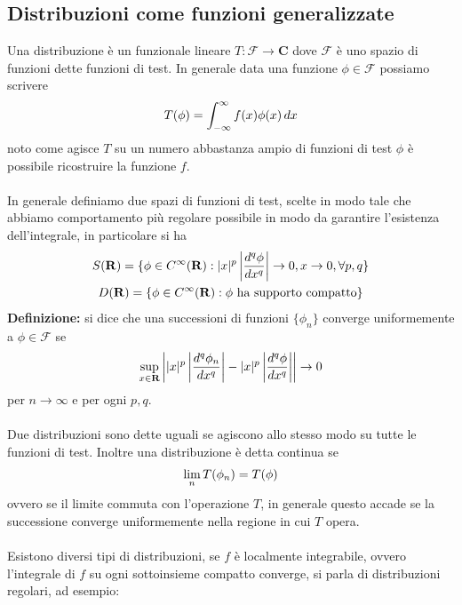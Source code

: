\documentclass{article}
\begin{document}
\subsection{Distribuzioni come funzioni generalizzate}
Una distribuzione è un funzionale lineare $T : \mathcal{F} \longrightarrow \mathbf{C}$ dove $\mathcal{F}$ è uno spazio di funzioni dette funzioni di test. In generale data una funzione $\phi \in \mathcal{F}$ possiamo scrivere
\begin{gather}
    T(\phi) = \int_{-\infty}^{\infty}f(x)\phi(x) \, dx \notag
\end{gather}
noto come agisce $T$ su un numero abbastanza ampio di funzioni di test $\phi$ è possibile ricostruire la funzione $f$. \\ \\
In generale definiamo due spazi di funzioni di test, scelte in modo tale che abbiamo comportamento più regolare possibile in modo da garantire l'esistenza dell'integrale, in particolare si ha
\begin{gather}
    S(\mathbf{R}) = \{\phi \in C^\infty(\mathbf{R}) : |x|^p\left|\frac{d^q\phi}{dx^q}\right| \rightarrow 0, x \rightarrow 0, \forall p, q\} \notag \\
    D(\mathbf{R}) = \{\phi \in C^\infty(\mathbf{R}) : \phi \text{ ha supporto compatto}\} \notag
\end{gather}
\textbf{Definizione:} si dice che una successioni di funzioni $\{\phi_n\}$ converge uniformemente a $\phi \in \mathcal{F}$ se
\begin{gather}
    \sup_{x \in \mathbf{R}}\left||x|^p\left|\frac{d^q\phi_n}{dx^q}\right| - |x|^p\left|\frac{d^q\phi}{dx^q}\right|\right| \rightarrow 0 \notag
\end{gather}
per $n \rightarrow \infty$ e per ogni $p, q$. \\ \\
Due distribuzioni sono dette uguali se agiscono allo stesso modo su tutte le funzioni di test. Inoltre una distribuzione è detta continua se
\begin{gather}
    \lim_n T(\phi_n) = T(\phi) \notag
\end{gather}
ovvero se il limite commuta con l'operazione $T$, in generale questo accade se la successione converge uniformemente nella regione in cui $T$ opera. \\ \\
Esistono diversi tipi di distribuzioni, se $f$ è localmente integrabile, ovvero l'integrale di $f$ su ogni sottoinsieme compatto converge, si parla di distribuzioni regolari, ad esempio: \\
\end{document}
